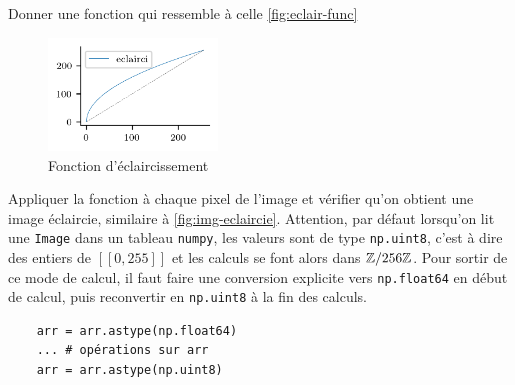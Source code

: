 \quessques Donner une fonction qui ressemble à celle \autoref{fig:eclair-func}

\begin{figure}[h!]
    \begin{center}
        \includegraphics[width=0.4\textwidth]{figures/10/eclair_func.png}
    \end{center}
    \caption{Fonction d'éclaircissement}
    \label{fig:eclair-func}
\end{figure}

\ssques Appliquer la fonction à chaque pixel de l'image et vérifier qu'on obtient une image éclaircie, similaire à \autoref{fig:img-eclaircie}. Attention, par défaut lorsqu'on lit une \texttt{Image} dans un tableau \texttt{numpy}, les valeurs sont de type \texttt{np.uint8}, c'est à dire des entiers de $ [\![0, 255]\!] $ et les calculs se font alors dans $ \mathbb{Z} / 256 \mathbb{Z} $. Pour sortir de ce mode de calcul, il faut faire une conversion explicite vers \texttt{np.float64} en début de calcul, puis reconvertir en \texttt{np.uint8} à la fin des calculs.

\begin{verbatim}
    arr = arr.astype(np.float64)
    ... # opérations sur arr
    arr = arr.astype(np.uint8)
\end{verbatim}

